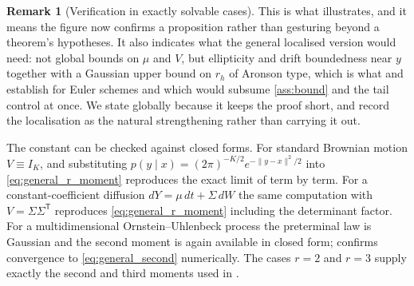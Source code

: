 \documentclass[11pt]{article}
\theoremstyle{definition}
\newtheorem{remark}[remark]{Remark}
\begin{document}
\begin{remark}[Verification in exactly solvable cases]
This is what  illustrates, and it means the figure now confirms a proposition rather than gesturing beyond a theorem's hypotheses. It also indicates what the general localised version would need: not global bounds on $\mu$ and $V$, but ellipticity and drift boundedness near $y$ together with a Gaussian upper bound on $r_h$ of Aronson type, which is what \citet{BallyTalay1996a,BallyTalay1996b} and \citet{KonakovMammen2002} establish for Euler schemes and which would subsume \ref{ass:bound} and the tail control at once. We state  globally because it keeps the proof short, and record the localisation as the natural strengthening rather than carrying it out.

The constant can be checked against closed forms. For standard Brownian motion $V\equiv I_K$, and substituting $p(y\mid x)=(2\pi)^{-K/2}e^{-\lVert y-x\rVert^2/2}$ into \eqref{eq:general_r_moment} reproduces the exact limit of  term by term. For a constant-coefficient diffusion $dY=\mu\,dt+\Sigma\,dW$ the same computation with $V=\Sigma\Sigma^{\mathsf T}$ reproduces \eqref{eq:general_r_moment} including the determinant factor. For a multidimensional Ornstein--Uhlenbeck process the preterminal law is Gaussian and the second moment is again available in closed form;  confirms convergence to \eqref{eq:general_second} numerically. The cases $r=2$ and $r=3$ supply exactly the second and third moments used in .
\end{remark}
\end{document}
